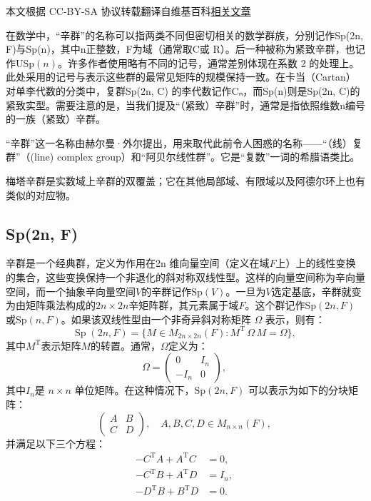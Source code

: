 
本文根据 CC-BY-SA 协议转载翻译自维基百科\href{https://en.wikipedia.org/wiki/Symplectic_group}{相关文章}

在数学中，“辛群”的名称可以指两类不同但密切相关的数学群族，分别记作Sp(2n, F)与Sp(n)，其中n正整数，F为域（通常取C或 R）。后一种被称为紧致辛群，也记作$\mathrm{USp}(n)$。许多作者使用略有不同的记号，通常差别体现在系数 2 的处理上。此处采用的记号与表示这些群的最常见矩阵的规模保持一致。在卡当（Cartan）对单李代数的分类中，复群Sp(2n, C) 的李代数记作Cₙ，而Sp(n)则是Sp(2n, C)的紧致实型。需要注意的是，当我们提及“（紧致）辛群”时，通常是指依照维数n编号的一族（紧致）辛群。

“辛群”这一名称由赫尔曼·外尔提出，用来取代此前令人困惑的名称——“（线）复群”（(line) complex group）和“阿贝尔线性群”。它是“复数”一词的希腊语类比。

梅塔辛群是实数域上辛群的双覆盖；它在其他局部域、有限域以及阿德尔环上也有类似的对应物。
\subsection{Sp(2n, F)}
辛群是一个经典群，定义为作用在2n 维向量空间（定义在域$F$上）上的线性变换的集合，这些变换保持一个非退化的斜对称双线性型。这样的向量空间称为辛向量空间，而一个抽象辛向量空间$V$的辛群记作$\mathrm{Sp}(V)$。一旦为$V$选定基底，辛群就变为由矩阵乘法构成的$2n \times 2n$辛矩阵群，其元素属于域$F$。这个群记作$\mathrm{Sp}(2n, F)$或$\mathrm{Sp}(n, F)$。如果该双线性型由一个非奇异斜对称矩阵 $\Omega$ 表示，则有：
$$
\operatorname{Sp}(2n,F) = \{ M \in M_{2n \times 2n}(F) : M^{\mathrm{T}} \, \Omega \, M = \Omega \},~
$$
其中$M^{\mathrm{T}}$表示矩阵$M$的转置。通常，$\Omega$定义为：
$$
\Omega = 
\begin{pmatrix}
0 & I_n \\
- I_n & 0
\end{pmatrix},~
$$
其中$I_n$是 $n \times n$ 单位矩阵。在这种情况下，$\mathrm{Sp}(2n, F)$ 可以表示为如下的分块矩阵：
$$
\begin{pmatrix}
A & B \\
C & D
\end{pmatrix}, \quad A, B, C, D \in M_{n \times n}(F),~
$$
并满足以下三个方程：
$$
\begin{aligned}
- C^{\mathrm{T}} A + A^{\mathrm{T}} C &= 0, \\
- C^{\mathrm{T}} B + A^{\mathrm{T}} D &= I_n, \\
- D^{\mathrm{T}} B + B^{\mathrm{T}} D &= 0.
\end{aligned}~
$$
